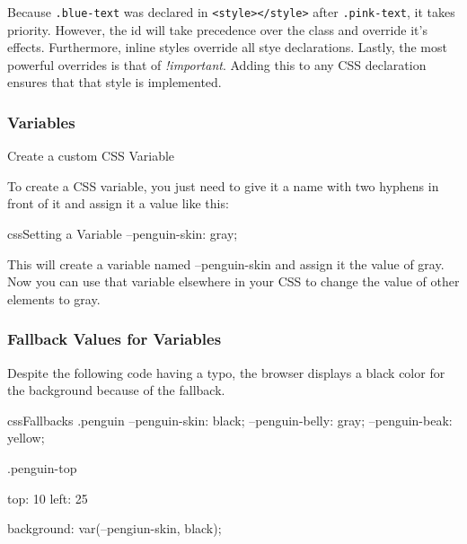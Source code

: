 Because \texttt{.blue-text} was declared in \texttt{<style></style>} after \texttt{.pink-text}, it takes priority. However, the id will take precedence over the class and override it's effects. Furthermore, inline styles override all stye declarations. Lastly, the most powerful overrides is that of \emph{!important}. Adding this to any CSS declaration ensures that that style is implemented.

\subsubsection{Variables}
Create a custom CSS Variable

To create a CSS variable, you just need to give it a name with two hyphens in front of it and assign it a value like this:
\begin{codeBlock}{css}{Setting a Variable}
--penguin-skin: gray;
\end{codeBlock}

This will create a variable named --penguin-skin and assign it the value of gray. Now you can use that variable elsewhere in your CSS to change the value of other elements to gray.

\subsubsection{Fallback Values for Variables}

Despite the following code having a typo, the browser displays a black color for the background because of the fallback.
\begin{codeBlock}{css}{Fallbacks}
  .penguin {
    --penguin-skin: black;
    --penguin-belly: gray;
    --penguin-beak: yellow;
  }

  .penguin-top {
    top: 10%
    left: 25%

    background: var(--pengiun-skin, black);
  }
\end{codeBlock}